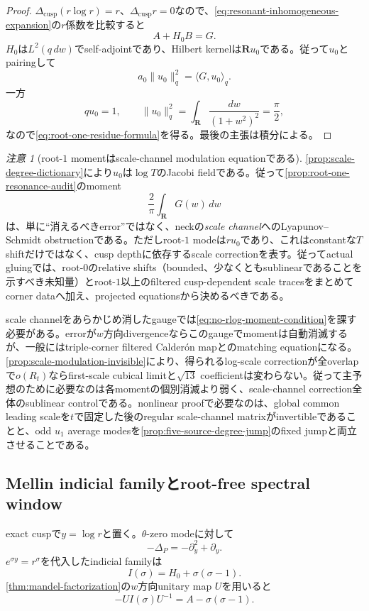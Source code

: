 \documentclass[11pt,a4paper]{ltjsarticle}
\theoremstyle{definition}
\theoremstyle{remark}
\newtheorem{remark}[theorem]{注意}
\newcommand{\RR}{\mathbf R}
\begin{document}
\begin{proof}
$\Delta_{\mathrm{cusp}}(r\log r)=r$、$\Delta_{\mathrm{cusp}}r=0$なので、\eqref{eq:resonant-inhomogeneous-expansion}の$r$係数を比較すると
\[
 A+H_0B=G.
\]
$H_0$は$L^2(q\,dw)$でself-adjointであり、Hilbert kernelは$\RR u_0$である。従って$u_0$とpairingして
\[
 a_0\|u_0\|_q^2=\langle G,u_0\rangle_q.
\]
一方
\[
 q u_0=1,
 \qquad
 \|u_0\|_q^2
 =\int_{\RR}\frac{dw}{(1+w^2)^2}
 =\frac\pi2,
\]
なので\eqref{eq:root-one-residue-formula}を得る。最後の主張は積分による。
\end{proof}

\begin{remark}[root-$1$ momentはscale-channel modulation equationである]\label{rem:resonance-audit-meaning}
\cref{prop:scale-degree-dictionary}により$u_0$は$\log T$のJacobi fieldである。従って\cref{prop:root-one-resonance-audit}のmoment
\[
 \frac2\pi\int_{\RR}G(w)\,dw
\]
は、単に``消えるべきerror''ではなく、neckの\emph{scale channel}へのLyapunov--Schmidt obstructionである。ただしroot-$1$ modeは$r u_0$であり、これはconstantな$T$ shiftだけではなく、cusp depthに依存するscale correctionを表す。従ってactual gluingでは、root-$0$のrelative shifts（bounded、少なくともsublinearであることを示すべき未知量）とroot-$1$以上のfiltered cusp-dependent scale tracesをまとめてcorner dataへ加え、projected equationsから決めるべきである。

scale channelをあらかじめ消したgaugeでは\eqref{eq:no-rlog-moment-condition}を課す必要がある。errorが$w$方向divergenceならこのgaugeでmomentは自動消滅するが、一般にはtriple-corner filtered Calder\'on mapとのmatching equationになる。\cref{prop:scale-modulation-invisible}により、得られるlog-scale correctionが全overlapで$o(R_t)$ならfirst-scale cubical limitと$\sqrt{13}$ coefficientは変わらない。従って主予想のために必要なのは各momentの個別消滅より弱く、scale-channel correction全体のsublinear controlである。nonlinear proofで必要なのは、global common leading scaleを$t$で固定した後のregular scale-channel matrixがinvertibleであることと、odd $u_1$ average modesを\cref{prop:five-source-degree-jump}のfixed jumpと両立させることである。
\end{remark}

\subsection{Mellin indicial familyとroot-free spectral window}
\label{subsec:indicial-family}

exact cuspで$y=\log r$と置く。$\theta$-zero modeに対して
\[
 -\Delta_P=-\partial_y^2+\partial_y.
\]
$e^{\sigma y}=r^\sigma$を代入したindicial familyは
\begin{equation}\label{eq:indicial-family-original}
 I(\sigma)=H_0+\sigma(\sigma-1).
\end{equation}
\cref{thm:mandel-factorization}の$w$方向unitary map $U$を用いると
\begin{equation}\label{eq:indicial-family-A}
 -UI(\sigma)U^{-1}=A-\sigma(\sigma-1).
\end{equation}
\end{document}
